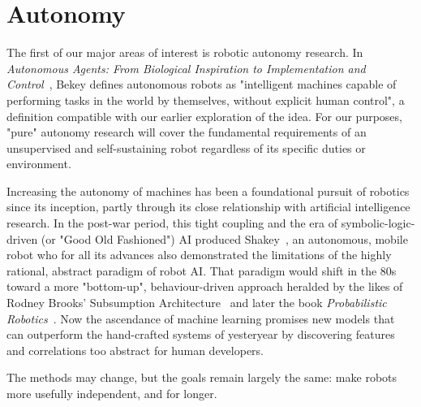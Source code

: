\documentclass{sfuthesis}
\begin{document}




\chapter{Autonomy}

The first of our major areas of interest is robotic autonomy research. In \textit{Autonomous Agents: From Biological Inspiration to Implementation and Control}~\cite{bekey2005autonomous}, Bekey defines autonomous robots as "intelligent machines capable of performing tasks in the world by themselves, without explicit human control", a definition compatible with our earlier exploration of the idea. For our purposes, "pure" autonomy research will cover the fundamental requirements of an unsupervised and self-sustaining robot regardless of its specific duties or environment.

Increasing the autonomy of machines has been a foundational pursuit of robotics since its inception, partly through its close relationship with artificial intelligence research. In the post-war period, this tight coupling and the era of symbolic-logic-driven (or "Good Old Fashioned") AI produced Shakey~\cite{nilsson1984shakey}, an autonomous, mobile robot who for all its advances also demonstrated the limitations of the highly rational, abstract paradigm of robot AI. That paradigm would shift in the 80s toward a more "bottom-up", behaviour-driven approach heralded by the likes of Rodney Brooks' Subsumption Architecture~\cite{brooks1986robust} and later the book \textit{Probabilistic Robotics}~\cite{thrun2005probabilistic}. Now the ascendance of machine learning promises new models that can outperform the hand-crafted systems of yesteryear by discovering features and correlations too abstract for human developers.

The methods may change, but the goals remain largely the same: make robots more usefully independent, and for longer.




\end{document}
